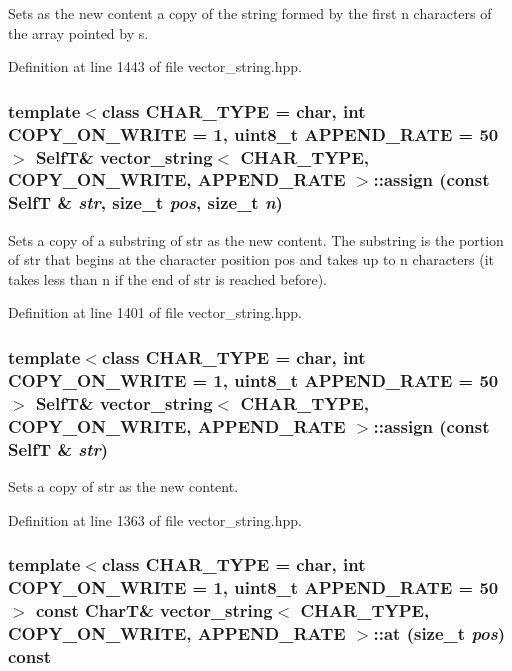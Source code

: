 Sets as the new content a copy of the string formed by the first n characters of the array pointed by s. 

Definition at line 1443 of file vector\_\-string.hpp.\hypertarget{classvector__string_370b202bdf3c095e5d91e2d1695bed8b}{
\subsubsection[{assign}]{\setlength{\rightskip}{0pt plus 5cm}template$<$class CHAR\_\-TYPE  = char, int COPY\_\-ON\_\-WRITE = 1, uint8\_\-t APPEND\_\-RATE = 50$>$ {\bf SelfT}\& {\bf vector\_\-string}$<$ CHAR\_\-TYPE, COPY\_\-ON\_\-WRITE, APPEND\_\-RATE $>$::assign (const {\bf SelfT} \& {\em str}, \/  size\_\-t {\em pos}, \/  size\_\-t {\em n})}}
\label{classvector__string_370b202bdf3c095e5d91e2d1695bed8b}


Sets a copy of a substring of str as the new content. The substring is the portion of str that begins at the character position pos and takes up to n characters (it takes less than n if the end of str is reached before). 

Definition at line 1401 of file vector\_\-string.hpp.\hypertarget{classvector__string_58a2e4110d4653022e5da2a46e5d56e5}{
\subsubsection[{assign}]{\setlength{\rightskip}{0pt plus 5cm}template$<$class CHAR\_\-TYPE  = char, int COPY\_\-ON\_\-WRITE = 1, uint8\_\-t APPEND\_\-RATE = 50$>$ {\bf SelfT}\& {\bf vector\_\-string}$<$ CHAR\_\-TYPE, COPY\_\-ON\_\-WRITE, APPEND\_\-RATE $>$::assign (const {\bf SelfT} \& {\em str})}}
\label{classvector__string_58a2e4110d4653022e5da2a46e5d56e5}


Sets a copy of str as the new content. 

Definition at line 1363 of file vector\_\-string.hpp.\hypertarget{classvector__string_e262ba5e7759fb7e570c459c2ec064ce}{
\subsubsection[{at}]{\setlength{\rightskip}{0pt plus 5cm}template$<$class CHAR\_\-TYPE  = char, int COPY\_\-ON\_\-WRITE = 1, uint8\_\-t APPEND\_\-RATE = 50$>$ const CharT\& {\bf vector\_\-string}$<$ CHAR\_\-TYPE, COPY\_\-ON\_\-WRITE, APPEND\_\-RATE $>$::at (size\_\-t {\em pos}) const}}
\label{classvector__string_e262ba5e7759fb7e570c459c2ec064ce}


